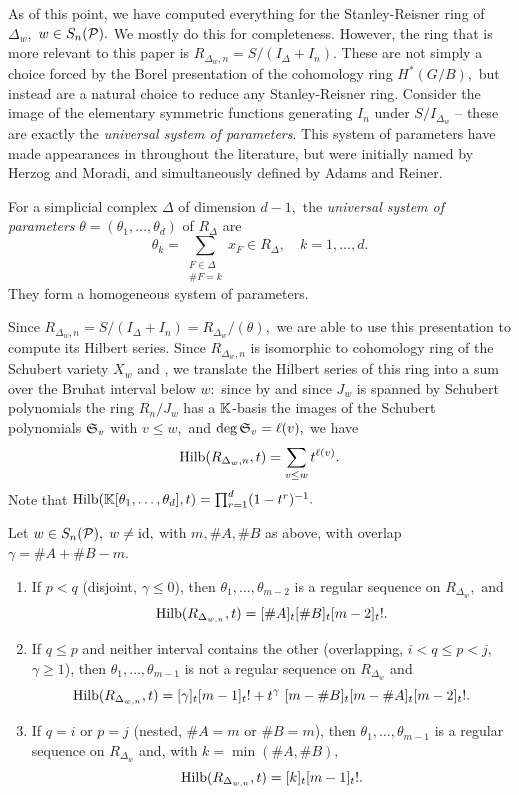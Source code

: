 As of this point, we have computed everything for the Stanley-Reisner ring of $\Delta_{w},$ $w\in S_n(\mathcal{P}).$ We mostly do this for completeness. However, the ring that is more relevant to this paper is $R_{\Delta_w,n} = S/(I_\Delta+I_n).$ These are not simply a choice forced by the Borel presentation of the cohomology ring $H^*(G/B),$ but instead are a natural choice to reduce any Stanley-Reisner ring. Consider the image of the elementary symmetric functions generating $I_n$ under $S/I_{\Delta_w}$ -- these are exactly the \emph{universal system of parameters}. This system of parameters have made appearances in throughout the literature, but were initially named by Herzog and Moradi, and simultaneously defined by Adams and Reiner.
\begin{definition}
\label{def: universal system of parameters}
    For a simplicial complex $\Delta$ of dimension $d-1,$ the \emph{universal system of parameters} $\theta = (\theta_1,\ldots,\theta_d)$ of $R_\Delta$ are 
    \[
    \theta_k = \sum_{\substack{F\in\Delta \\ \#F = k}}x_F\in R_\Delta,\quad k = 1,\ldots,d.
    \]
    They form a homogeneous system of parameters.
\end{definition}
Since $R_{\Delta_w,n} = S/(I_\Delta+I_n) = R_{\Delta_w}/(\theta),$ we are able to use this presentation to compute its Hilbert series. Since $R_{\Delta_w,n}$ is isomorphic to cohomology ring of the Schubert variety $X_w$ and , we translate the Hilbert series of this ring into a sum over the Bruhat interval below $w:$ since by  and since $J_w$ is spanned by Schubert polynomials  the ring $R_n/J_w$ has a $\mathbb{K}$-basis the images of the Schubert polynomials $\mathfrak{S}_v$ with $v\leq w,$ and $\deg\mathfrak{S}_v = \ell(v),$ we have
\[
\mathrm{Hilb}(R_{\Delta_w,n},t) = \sum_{v\leq w}t^{\ell(v)}.
\]
Note that $\mathrm{Hilb}(\mathbb{K}[\theta_1,\ldots,\theta_d],t) = \prod_{r=1}^d(1-t^r)^{-1}.$
\begin{theorem}
\label{thm: hilbert series for R_Delta_n}
    Let $w\in S_n(\mathcal{P}),$ $w\neq\mathrm{id},$ with $m, \#A, \#B$ as above, with overlap $\gamma = \#A + \#B - m.$
    \begin{enumerate}
        \item If $p < q$ (disjoint, $\gamma\leq 0$), then $\theta_1,\ldots,\theta_{m-2}$ is a regular sequence on $R_{\Delta_{w}},$ and 
        \[
        \mathrm{Hilb}(R_{\Delta_{w,n}},t) = [\#A]_t[\#B]_t[m-2]_t!.
        \]
        \item If $q\leq p$ and neither interval contains the other (overlapping, $i < q\leq p < j,$ $\gamma\geq 1$), then $\theta_1,\ldots,\theta_{m-1}$ is not a regular sequence on $R_{\Delta_w}$ and 
        \[
        \mathrm{Hilb}(R_{\Delta_{w,n}},t) 
        = [\gamma]_t[m-1]_t! + t^\gamma~[m-\#B]_t[m-\#A]_t[m-2]_t!.
        \]
        \item If $q = i$ or $p = j$ (nested, $\#A = m$ or $\#B = m$), then $\theta_1,\ldots,\theta_{m-1}$ is a regular sequence on $R_{\Delta_w}$ and, with $ k = \min(\#A,\#B),$
        \[
        \mathrm{Hilb}(R_{\Delta_{w,n}},t) = [k]_t[m - 1]_t!. 
        \]
    \end{enumerate}
\end{theorem}
